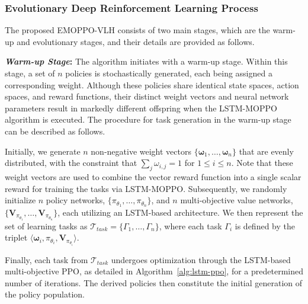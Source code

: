 \documentclass[10pt,journal,compsoc]{IEEEtran}
\begin{document}
\subsubsection{Evolutionary Deep Reinforcement Learning Process}

\par The proposed EMOPPO-VLH consists of two main stages, which are the warm-up and evolutionary stages, and their details are provided as follows.

\par \textbf{\textit{Warm-up Stage}:} The algorithm initiates with a warm-up stage. Within this stage, a set of $n$ policies is stochastically generated, each being assigned a corresponding weight. Although these policies share identical state spaces, action spaces, and reward functions, their distinct weight vectors and neural network parameters result in markedly different offspring when the LSTM-MOPPO algorithm is executed. The procedure for task generation in the warm-up stage can be described as follows.

\par Initially, we generate $n$ non-negative weight vectors $\{\boldsymbol{\omega}_1, \dots, \boldsymbol{\omega}_n\}$ that are evenly distributed, with the constraint that $\sum_j \omega_{i, j} = 1$ for $1 \leq i \leq n$. Note that these weight vectors are used to combine the vector reward function into a single scalar reward for training the tasks via LSTM-MOPPO. 
Subsequently, we randomly initialize $n$ policy networks, $\{ \pi_{\theta_1}, \dots, \pi_{\theta_n} \}$, and $n$ multi-objective value networks, $\{ \boldsymbol{V}_{\pi_{\theta_1}}, \dots, \boldsymbol{V}_{\pi_{\theta_n}} \}$, each utilizing an LSTM-based architecture. We then represent the set of learning tasks as $\mathcal{T}_{task} = \{ \Gamma_1, \dots, \Gamma_n \}$, where each task $\Gamma_i$ is defined by the triplet $\langle \boldsymbol{\omega}_i, \pi_{\theta_i}, \boldsymbol{V}_{\pi_{\theta_i}} \rangle$.

\par Finally, each task from $\mathcal{T}_{task}$ undergoes optimization through the LSTM-based multi-objective PPO, as detailed in Algorithm~\ref{alg:lstm-ppo}, for a predetermined number of iterations. The derived policies then constitute the initial generation of the policy population.
\end{document}
